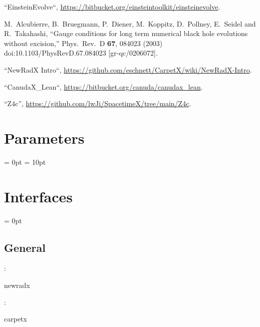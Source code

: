 \begin{thebibliography}{9}

 ``EinsteinEvolve``,
  \url{https://bitbucket.org/einsteintoolkit/einsteinevolve}.

  M.~Alcubierre, B.~Bruegmann, P.~Diener, M.~Koppitz, D.~Pollney, E.~Seidel and R.~Takahashi,
  ``Gauge conditions for long term numerical black hole evolutions without excision,''
  Phys.\ Rev.\ D {\bf 67}, 084023 (2003)
  doi:10.1103/PhysRevD.67.084023
  [gr-qc/0206072].

 ``NewRadX Intro``,
  \url{https://github.com/eschnett/CarpetX/wiki/NewRadX-Intro}.

 ``CanudaX\_Lean``,
  \url{https://bitbucket.org/canuda/canudax_lean}.

 ``Z4c'',
  \url{https://github.com/lwJi/SpacetimeX/tree/main/Z4c}.

\end{thebibliography}




\section{Parameters} 


\parskip = 0pt
\parskip = 10pt 

\section{Interfaces} 


\parskip = 0pt

\vspace{3mm} \subsection*{General}

: 

newradx
\vspace{2mm}

: 

carpetx
\vspace{2mm}

\vspace{5mm}

